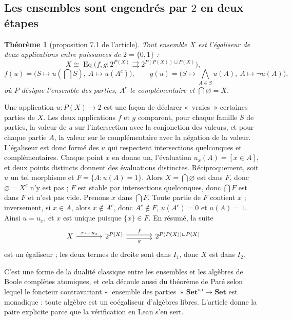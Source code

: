 \documentclass[11pt,a4paper]{amsart}
\theoremstyle{definition}
\theoremstyle{plain}
\newtheorem{theoreme}{Théorème}
\theoremstyle{remark}
\newcommand{\Set}{\mathbf{Set}}
\newcommand{\Eq}{\operatorname{Eq}}
\begin{document}
\subsection{Les ensembles sont engendrés par $2$ en deux étapes}

\begin{theoreme}[proposition 7.1 de l'article]
Tout ensemble $X$ est l'égaliseur de deux applications entre puissances de $2=\{0,1\}$ :
\[X\cong\Eq\bigl(f,g\colon2^{P(X)}\rightrightarrows2^{P(P(X))\sqcup P(X)}\bigr),\]
\[f(u)=\bigl(S\mapsto u(\textstyle\bigcap S),\ A\mapsto u(A^c)\bigr),\qquad g(u)=\bigl(S\mapsto\textstyle\bigwedge_{A\in S}u(A),\ A\mapsto\neg u(A)\bigr),\]
où $P$ désigne l'ensemble des parties, $A^c$ le complémentaire et $\bigcap\varnothing=X$.
\end{theoreme}

Une application $u\colon P(X)\to2$ est une façon de déclarer «~vraies~» certaines parties de $X$. Les deux applications $f$ et $g$ comparent, pour chaque famille $S$ de parties, la valeur de $u$ sur l'intersection avec la conjonction des valeurs, et pour chaque partie $A$, la valeur sur le complémentaire avec la négation de la valeur. L'égaliseur est donc formé des $u$ qui respectent intersections quelconques et complémentaires. Chaque point $x$ en donne un, l'évaluation $u_x(A)=[x\in A]$, et deux points distincts donnent des évaluations distinctes. Réciproquement, soit $u$ un tel morphisme et $F=\{A:u(A)=1\}$. Alors $X=\bigcap\varnothing$ est dans $F$, donc $\varnothing=X^c$ n'y est pas ; $F$ est stable par intersections quelconques, donc $\bigcap F$ est dans $F$ et n'est pas vide. Prenons $x$ dans $\bigcap F$. Toute partie de $F$ contient $x$ ; inversement, si $x\in A$, alors $x\notin A^c$, donc $A^c\notin F$, $u(A^c)=0$ et $u(A)=1$. Ainsi $u=u_x$, et $x$ est unique puisque $\{x\}\in F$. En résumé, la suite
\[\begin{tikzcd}[column sep=large]
X \arrow[r, "x\,\mapsto\, u_x"] & 2^{P(X)} \arrow[r, shift left=1, "f"] \arrow[r, shift right=1, "g"'] & 2^{P(P(X))\sqcup P(X)}
\end{tikzcd}\]
est un égaliseur ; les deux termes de droite sont dans $I_1$, donc $X$ est dans $I_2$.

C'est une forme de la dualité classique entre les ensembles et les algèbres de Boole complètes atomiques, et cela découle aussi du théorème de Paré selon lequel le foncteur contravariant «~ensemble des parties~» $\Set^{\mathrm{op}}\to\Set$ est monadique : toute algèbre est un coégaliseur d'algèbres libres. L'article donne la paire explicite parce que la vérification en Lean s'en sert.
\end{document}
